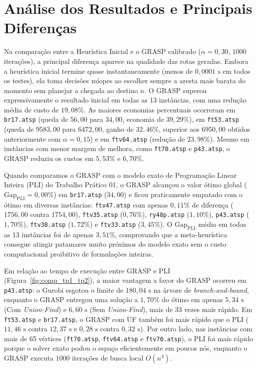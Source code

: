 \documentclass[10pt,a4paper]{article}
\begin{document}
\section{Análise dos Resultados e Principais Diferenças}
Na comparação entre a Heurística Inicial e o GRASP calibrado ($\alpha = 0,30$, $1000$ iterações), a principal diferença aparece na qualidade das rotas geradas. Embora a heurística inicial termine quase instantaneamente (menos de $0,0001\text{ s}$ em todos os testes), ela toma decisões míopes ao escolher sempre a aresta mais barata do momento sem planejar a chegada ao destino $n$. O GRASP superou expressivamente o resultado inicial em todas as 13 instâncias, com uma redução média de custo de $19,08\%$. As maiores economias percentuais ocorreram em \texttt{br17.atsp} (queda de $56,00$ para $34,00$, economia de $39,29\%$), em \texttt{ft53.atsp} (queda de $9583,00$ para $6472,00$, ganho de $32,46\%$, superior aos $6950,00$ obtidos anteriormente com $\alpha = 0,15$) e em \texttt{ftv64.atsp} (redução de $23,98\%$). Mesmo em instâncias com menor margem de melhora, como \texttt{ft70.atsp} e \texttt{p43.atsp}, o GRASP reduziu os custos em $5,53\%$ e $6,70\%$.

Quando comparamos o GRASP com o modelo exato de Programação Linear Inteira (PLI) do Trabalho Prático 01, o GRASP alcançou o valor ótimo global ($\text{Gap}_{\text{PLI}} = 0,00\%$) em \texttt{br17.atsp} ($34,00$) e ficou praticamente empatado com o ótimo em diversas instâncias: \texttt{ftv47.atsp} com apenas $0,11\%$ de diferença ($1756,00$ contra $1754,00$), \texttt{ftv35.atsp} ($0,76\%$), \texttt{ry48p.atsp} ($1,10\%$), \texttt{p43.atsp} ($1,70\%$), \texttt{ftv38.atsp} ($1,72\%$) e \texttt{ftv33.atsp} ($3,45\%$). O $\text{Gap}_{\text{PLI}}$ médio em todas as 13 instâncias foi de apenas $3,51\%$, comprovando que a meta-heurística consegue atingir patamares muito próximos do modelo exato sem o custo computacional proibitivo de formulações inteiras.

Em relação ao tempo de execução entre GRASP e PLI (Figura~\ref{fig:comp_tp1_tp2}), a maior vantagem a favor do GRASP ocorreu em \texttt{p43.atsp}: o Gurobi esgotou o limite de $180,04\text{ s}$ na árvore de \textit{branch-and-bound}, enquanto o GRASP entregou uma solução a $1,70\%$ do ótimo em apenas $5,34\text{ s}$ (Com \textit{Union-Find}) e $6,60\text{ s}$ (Sem \textit{Union-Find}), mais de $33$ vezes mais rápido. Em \texttt{ft53.atsp} e \texttt{br17.atsp}, o GRASP com UF também foi mais rápido que o PLI ($11,46\text{ s}$ contra $12,37\text{ s}$ e $0,28\text{ s}$ contra $0,32\text{ s}$). Por outro lado, nas instâncias com mais de 65 vértices (\texttt{ft70.atsp}, \texttt{ftv64.atsp} e \texttt{ftv70.atsp}), o PLI foi mais rápido porque o solver exato podou o espaço eficientemente em poucos nós, enquanto o GRASP executa $1000$ iterações de busca local $O(n^3)$.
\end{document}
